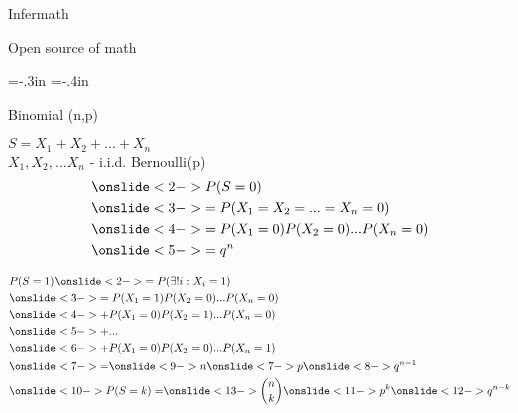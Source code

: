 \documentclass[20pt,xcolor={dvipsnames}]{beamer}
\begin{document}
\begin{frame}[c]

\centering


\vspace{-1cm}

\Huge Infermath

\normalsize Open source of math 

\end{frame}

\hoffset=-.3in
\voffset=-.4in

\begin{frame}[c]

\centering

\vspace{1cm}

Binomial (n,p)

$S = X_1 + X_2 + ... + X_n$ \\
$X_1, X_2, ... X_n $ - i.i.d. Bernoulli(p) \\

\begin{align*} 
& \onslide<2->{P(S=0) } \\
& \onslide<3->{=P(X_1=X_2=...=X_n=0)} \\
& \onslide<4->{=P(X_1=0)P(X_2=0)...P(X_n=0)} \\
& \onslide<5->{=q^n} \\
\end{align*}

\end{frame}

\begin{frame}

\begin{align*} 
& P(S=1) \onslide<2->{=P(\exists ! i: X_i=1)} \\
& \onslide<3->{=P(X_1=1)P(X_2=0)...P(X_n=0)} \\
& \onslide<4->{+P(X_1=0)P(X_2=1)...P(X_n=0)} \\
& \onslide<5->{+...} \\
& \onslide<6->{+P(X_1=0)P(X_2=0)...P(X_n=1)} \\
& \onslide<7->{=}\onslide<9->{n}\onslide<7->{p}\onslide<8->{q^{n-1}} \\
& \onslide<10->{P(S=k)=} \onslide<13->{{n \choose k}} \onslide<11->{p^{k}}\onslide<12->{q^{n-k}}\\
\end{align*}

\end{frame}
\end{document}
